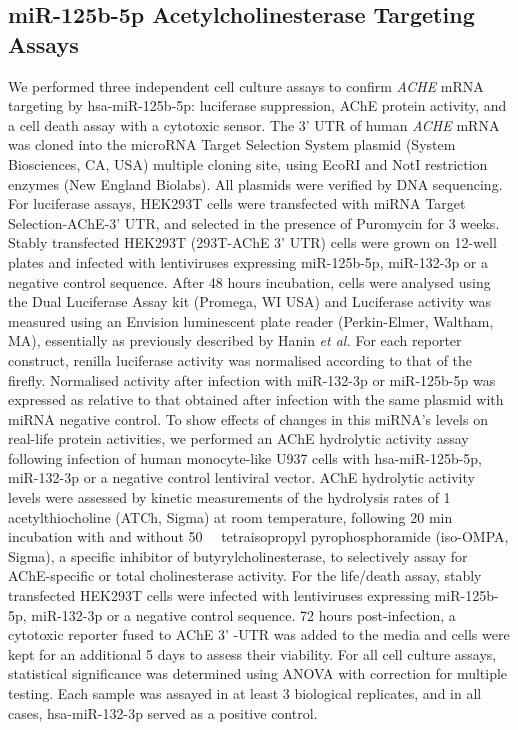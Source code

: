 \begin{method}

\subsection{miR-125b-5p Acetylcholinesterase Targeting Assays} \label{sec:cellculture:mir125}
We performed three independent cell culture assays to confirm \emph{ACHE} mRNA targeting by hsa-miR-125b-5p: luciferase suppression, AChE protein activity, and a cell death assay with a cytotoxic sensor. The 3' UTR of human \emph{ACHE} mRNA\cite{Soreq1990} was cloned into the microRNA Target Selection System plasmid (System Biosciences, CA, USA) multiple cloning site, using EcoRI and NotI restriction enzymes (New England Biolabs). All plasmids were verified by DNA sequencing. For luciferase assays, HEK293T cells were transfected with miRNA Target Selection-AChE-3' UTR, and selected in the presence of Puromycin for 3 weeks. Stably transfected HEK293T (293T-AChE 3' UTR) cells were grown on 12-well plates and infected with lentiviruses expressing miR-125b-5p, miR-132-3p or a negative control sequence. After 48 hours incubation, cells were analysed using the Dual Luciferase Assay kit (Promega, WI USA) and Luciferase activity was measured using an Envision luminescent plate reader (Perkin-Elmer, Waltham, MA), essentially as previously described by Hanin \emph{et al.}\cite{Hanin2014} For each reporter construct, renilla luciferase activity was normalised according to that of the firefly. Normalised activity after infection with miR-132-3p or miR-125b-5p was expressed as relative to that obtained after infection with the same plasmid with miRNA negative control. To show effects of changes in this miRNA’s levels on real-life protein activities, we performed an AChE hydrolytic activity assay following infection of human monocyte-like U937 cells with hsa-miR-125b-5p, miR-132-3p or a negative control lentiviral vector. AChE hydrolytic activity levels were assessed by kinetic measurements of the hydrolysis rates of \SI{1}{\milli\Molar} acetylthiocholine (ATCh, Sigma) at room temperature, following 20 min incubation with and without \SI{50}{\micro\Molar} tetraisopropyl pyrophosphoramide (iso-OMPA, Sigma), a specific inhibitor of butyrylcholinesterase, to selectively assay for AChE-specific or total cholinesterase activity. For the life/death assay, stably transfected HEK293T cells were infected with lentiviruses expressing miR-125b-5p, miR-132-3p or a negative control sequence. 72 hours post-infection, a cytotoxic reporter fused to AChE 3' -UTR was added to the media and cells were kept for an additional 5 days to assess their viability. For all cell culture assays, statistical significance was determined using ANOVA with correction for multiple testing. Each sample was assayed in at least 3 biological replicates, and in all cases, hsa-miR-132-3p served as a positive control.

\end{method}

